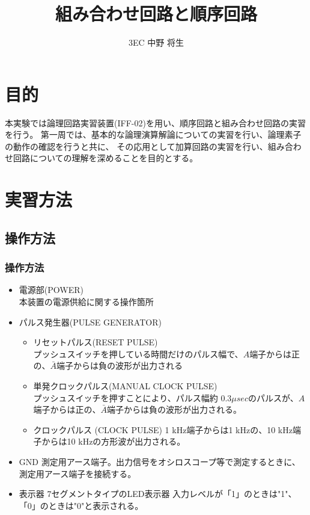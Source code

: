 \documentclass[dvipdfmx]{jsarticle}
\begin{document}
	\title{組み合わせ回路と順序回路}
	\author{3EC 中野 将生}
	\maketitle
	\section{目的}
		本実験では論理回路実習装置(IFF-02)を用い、順序回路と組み合わせ回路の実習を行う。
		第一周では、基本的な論理演算解論についての実習を行い、論理素子の動作の確認を行うと共に、
		その応用として加算回路の実習を行い、組み合わせ回路についての理解を深めることを目的とする。
		\section{実習方法}
			\subsection{操作方法}
				\subsubsection{操作方法}
					\begin{itemize}
						\item 電源部(POWER) \\
							本装置の電源供給に関する操作箇所
						\item パルス発生器(PULSE GENERATOR)
							\begin{itemize}
								\item リセットパルス(RESET PULSE) \\
									プッシュスイッチを押している時間だけのパルス幅で、$A$端子からは正の、$\bar{A}$端子からは負の波形が出力される
								\item 単発クロックパルス(MANUAL CLOCK PULSE) \\
									プッシュスイッチを押すことにより、パルス幅約 $0.3 \mu sec$のパルスが、$A$端子からは正の、$\bar{A}$端子からは負の波形が出力される。
								\item クロックパルス (CLOCK PULSE)
									1 kHz端子からは1 kHzの、10 kHz端子からは10 kHzの方形波が出力される。
							\end{itemize}
						\item GND
							測定用アース端子。出力信号をオシロスコープ等で測定するときに、測定用アース端子を接続する。
						\item 表示器
							7セグメントタイプのLED表示器
							入力レベルが「1」のときは"1"、「0」のときは"0"と表示される。
					\end{itemize}
\end{document}
